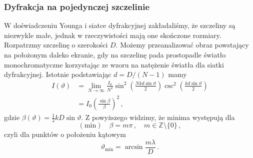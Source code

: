 \documentclass[../main.tex]{subfiles}
\begin{document}
\subsubsection{Dyfrakcja na pojedynczej szczelinie}
W doświadczeniu Younga i siatce dyfrakcyjnej zakładaliśmy, że szczeliny są niezwykle małe, jednak w rzeczywistości mają one skończone rozmiary. Rozpatrzmy szczelinę o szerokości \(D\). Możemy przeanalizować obraz powstający na położonym daleko ekranie, gdy na szczelinę pada prostopadle światło monochromatyczne korzystając ze wzoru na natężenie światła dla siatki dyfrakcyjnej. Istotnie podstawiając \(d=D/(N-1)\) mamy 
\begin{equation*}
\begin{split}
    I(\vartheta)&=\lim_{N\to\infty}\frac{I_0}{N^2}\sin^2\left(\frac{Nkd\sin\vartheta}{2}\right)\csc^2\left(\frac{kd\sin\vartheta}{2}\right)\\
    &=I_0\left(\frac{\sin\beta}{\beta}\right)^2\,,
\end{split}
\end{equation*}
gdzie \(\beta(\vartheta)=\frac{1}{2}kD\sin\vartheta\). Z powyższego widzimy, że minima występują dla 
\begin{equation*}
    (\text{min})\quad \beta=m\pi\,,\quad m\in\mathbb{Z}\setminus \{0\}\,,
\end{equation*}
czyli dla punktów o położeniu kątowym
\begin{equation*}
    \vartheta_\text{min}=\arcsin\frac{m\lambda}{D}\,.
\end{equation*}
\end{document}
